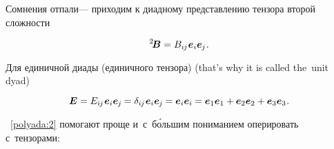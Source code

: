 \begin{otherlanguage}{russian}

Сомнения отпали\:--- приходим к диадному представлению тензора второй сложности

\nopagebreak\vspace{-0.2em}\begin{equation}\label{polyada:2}
^2\!\bm{B} = B_{i\hspace{-0.1ex}j} \hspace{.1ex} \bm{e}_i \bm{e}_{\hspace{-0.1ex}j} \hspace{.1ex} .
\end{equation}

\vspace{-0.2em} Для единичной диады (единичного тензора) (that’s why it is called the~unit dyad)

\nopagebreak\vspace{-0.1em}\begin{equation*}
\bm{E} =
E_{i\hspace{-0.1ex}j} \hspace{.16ex} \bm{e}_i \bm{e}_{\hspace{-0.1ex}j} \hspace{-0.1ex} =
\delta_{i\hspace{-0.1ex}j} \hspace{.16ex} \bm{e}_i \bm{e}_{\hspace{-0.1ex}j} \hspace{-0.1ex} =
\bm{e}_i \bm{e}_i \hspace{-0.1ex} =
\bm{e}_1 \bm{e}_1 + \bm{e}_2 \bm{e}_2 + \bm{e}_3 \bm{e}_3
\hspace{.1ex} .
\end{equation*}

~\eqref{polyada:2} помогают проще и~с~б\'{о}льшим пониманием оперировать с~тензорами:


\end{otherlanguage}
